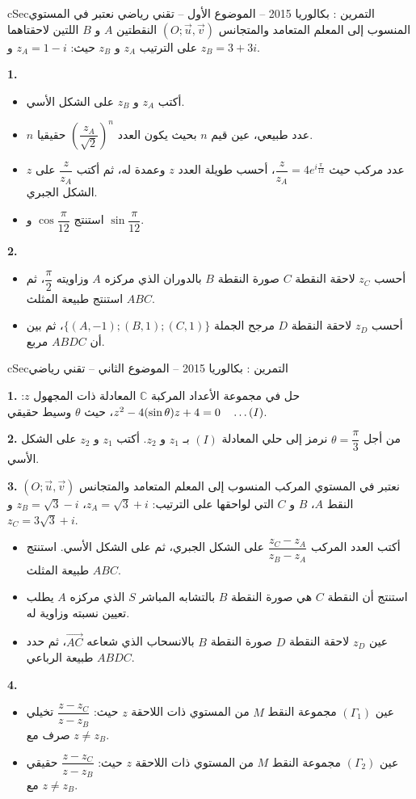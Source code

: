\documentclass[12pt,a4paper]{article}
\newenvironment{BOX}[2]{\begin{otherlanguage}{english}\begin{arbox}{#1}{#2}}{\end{arbox}\end{otherlanguage}}
\newcounter{exo}
\newenvironment{tamrin}[1]{\stepcounter{exo}\begin{BOX}{cSec}{التمرين \theexo: #1}}{\end{BOX}}
\renewcommand{\dots}{\mathinner{\ldotp\ldotp\ldotp}}
\newenvironment{sq}{\begin{itemize}[leftmargin=2.4em,itemsep=3pt]}{\end{itemize}}
\newcommand{\qa}{\item[(أ)]}\newcommand{\qb}{\item[(ب)]}\newcommand{\qc}{\item[(جـ)]}\newcommand{\qd}{\item[(د)]}\newcommand{\qe}{\item[(هـ)]}
\newcommand{\QQ}[1]{\par\smallskip\textbf{#1.} }
\begin{document}
\begin{tamrin}{بكالوريا 2015 -- الموضوع الأول -- تقني رياضي}
نعتبر في المستوي المنسوب إلى المعلم المتعامد والمتجانس $(O;\vec u,\vec v)$ النقطتين $A$ و $B$ اللتين لاحقتاهما على الترتيب $z_A$ و $z_B$ حيث: $z_A=1-i$ و $z_B=3+3i$.

\QQ{1}
\begin{sq}
\qa أكتب $z_A$ و $z_B$ على الشكل الأسي.
\qb $n$ عدد طبيعي، عين قيم $n$ بحيث يكون العدد $\left(\dfrac{z_A}{\sqrt2}\right)^n$ حقيقيا.
\qc $z$ عدد مركب حيث $\dfrac{z}{z_A}=4e^{i\frac{\pi}{12}}$، أحسب طويلة العدد $z$ وعمدة له، ثم أكتب $\dfrac{z}{z_A}$ على الشكل الجبري.
\qd استنتج $\cos\dfrac{\pi}{12}$ و $\sin\dfrac{\pi}{12}$.
\end{sq}
\QQ{2}
\begin{sq}
\qa أحسب $z_C$ لاحقة النقطة $C$ صورة النقطة $B$ بالدوران الذي مركزه $A$ وزاويته $\dfrac{\pi}{2}$، ثم استنتج طبيعة المثلث $ABC$.
\qb أحسب $z_D$ لاحقة النقطة $D$ مرجح الجملة $\{(A,-1);(B,1);(C,1)\}$، ثم بين أن $ABDC$ مربع.
\end{sq}
\end{tamrin}

\begin{tamrin}{بكالوريا 2015 -- الموضوع الثاني -- تقني رياضي}
\QQ{1} حل في مجموعة الأعداد المركبة $\mathbb{C}$ المعادلة ذات المجهول $z$: $z^2-4(\sin\theta)z+4=0\quad\dots(I)$، حيث $\theta$ وسيط حقيقي.

\QQ{2} من أجل $\theta=\dfrac{\pi}{3}$ نرمز إلى حلي المعادلة $(I)$ بـ $z_1$ و $z_2$. أكتب $z_1$ و $z_2$ على الشكل الأسي.

\QQ{3} نعتبر في المستوي المركب المنسوب إلى المعلم المتعامد والمتجانس $(O;\vec u,\vec v)$ النقط $A$، $B$ و $C$ التي لواحقها على الترتيب: $z_A=\sqrt3+i$، $z_B=\sqrt3-i$ و $z_C=3\sqrt3+i$.
\begin{sq}
\qa أكتب العدد المركب $\dfrac{z_C-z_A}{z_B-z_A}$ على الشكل الجبري، ثم على الشكل الأسي. استنتج طبيعة المثلث $ABC$.
\qb استنتج أن النقطة $C$ هي صورة النقطة $B$ بالتشابه المباشر $S$ الذي مركزه $A$ يطلب تعيين نسبته وزاوية له.
\qc عين $z_D$ لاحقة النقطة $D$ صورة النقطة $B$ بالانسحاب الذي شعاعه $\overrightarrow{AC}$، ثم حدد طبيعة الرباعي $ABDC$.
\end{sq}
\QQ{4}
\begin{sq}
\qa عين $(\Gamma_1)$ مجموعة النقط $M$ من المستوي ذات اللاحقة $z$ حيث: $\dfrac{z-z_C}{z-z_B}$ تخيلي صرف مع $z\neq z_B$.
\qb عين $(\Gamma_2)$ مجموعة النقط $M$ من المستوي ذات اللاحقة $z$ حيث: $\dfrac{z-z_C}{z-z_B}$ حقيقي مع $z\neq z_B$.
\end{sq}
\end{tamrin}
\end{document}
